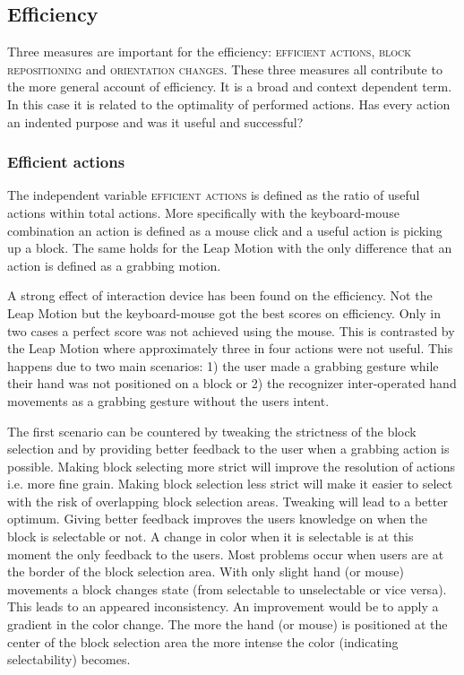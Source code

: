 \subsection{Efficiency}

Three measures are important for the efficiency: \textsc{efficient actions}, \textsc{block repositioning} and \textsc{orientation changes}. These three measures all contribute
 to the more general account of efficiency. It is a broad and context dependent term. In this case it is related to the optimality of performed actions. Has every action an indented
 purpose and was it useful and successful?

\subsubsection{Efficient actions}
The independent variable \textsc{efficient actions } is defined as the ratio of useful actions within total actions. More specifically with the keyboard-mouse combination an action 
is defined as a mouse click and a useful action is picking up a block. The same holds for the Leap Motion with the only difference that an action is defined as a grabbing motion.

A strong effect of interaction device has been found on the efficiency. Not the Leap Motion but the keyboard-mouse got the best scores on efficiency. Only in two cases a perfect score 
was not achieved using the mouse. This is contrasted by the Leap Motion where approximately three in four actions were not useful. This happens due to two main scenarios: 1) the user
 made a grabbing gesture while their hand was not positioned on a block or 2) the recognizer inter-operated hand movements as a grabbing gesture without the users intent.  

The first scenario can be countered by tweaking the strictness of the block selection and by providing better feedback to the user when a grabbing action is possible. Making block 
selecting more strict will improve the resolution of actions i.e. more fine grain. Making block selection less strict will make it easier to select with the risk of overlapping block
 selection areas. Tweaking will lead to a better optimum. Giving better feedback improves the users knowledge on when the block is selectable or not. A change in color when it is 
 selectable is at this moment the only feedback to the users. Most problems occur when users are at the border of the block selection area. With only slight hand (or mouse) 
 movements a block changes state (from selectable to unselectable or vice versa). This leads to an appeared inconsistency. An improvement would be to apply a gradient in the 
 color change. The more the hand (or mouse) is positioned at the center of the block selection area the more intense the color (indicating selectability) becomes. 

